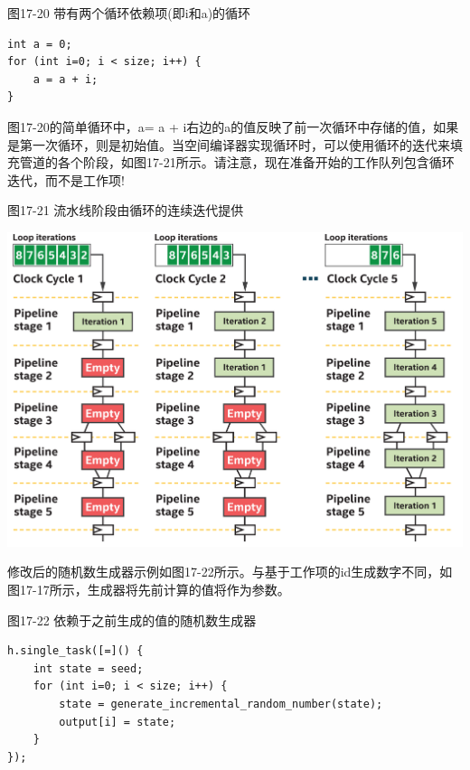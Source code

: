 \hspace*{\fill} \par %
图17-20 带有两个循环依赖项(即i和a)的循环
\begin{lstlisting}[caption={}]
int a = 0;
for (int i=0; i < size; i++) {
	a = a + i;
}
\end{lstlisting}

图17-20的简单循环中，a= a + i右边的a的值反映了前一次循环中存储的值，如果是第一次循环，则是初始值。当空间编译器实现循环时，可以使用循环的迭代来填充管道的各个阶段，如图17-21所示。请注意，现在准备开始的工作队列包含循环迭代，而不是工作项!\par

\hspace*{\fill} \par %
图17-21 流水线阶段由循环的连续迭代提供
\begin{center}
	\includegraphics[width=1.0\textwidth]{content/chapter-17/images/17}
\end{center}

修改后的随机数生成器示例如图17-22所示。与基于工作项的id生成数字不同，如图17-17所示，生成器将先前计算的值将作为参数。\par

\hspace*{\fill} \par %
图17-22 依赖于之前生成的值的随机数生成器
\begin{lstlisting}[caption={}]
h.single_task([=]() {
	int state = seed;
	for (int i=0; i < size; i++) {
		state = generate_incremental_random_number(state);
		output[i] = state;
	}
});
\end{lstlisting}

